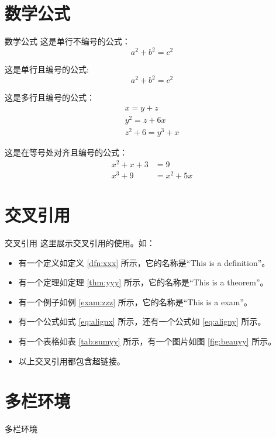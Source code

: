 \documentclass[compress,10pt,dvipsnames,notheorems]{beamer} %
\begin{document}
\section{数学公式}%
\begin{frame}{数学公式}
	这是单行不编号的公式：
	\[ a^2 + b^2 = c^2 \]
	
	这是单行且编号的公式:
	\begin{equation}
		a^2 + b^2 = c^2
	\end{equation}

	这是多行且编号的公式：
	\begin{gather}
		x = y + z \\
		y^2 = z + 6x \\
		z^2 + 6 = y^3 + x
	\end{gather}
	
	这是在等号处对齐且编号的公式：
	\begin{align}
		x^2 + x + 3 &= 9 \label{eq:alignx} \\
		x^3 + 9 &= x^2 + 5x \label{eq:aligny}
	\end{align}	
\end{frame}

\section{交叉引用}

\begin{frame}{交叉引用}
	这里展示交叉引用的使用。如：
	\begin{itemize}
		\item 有一个定义如定义 \ref{dfn:xxx} 所示，它的名称是“This is a definition”。
		\item 有一个定理如定理 \ref{thm:yyy} 所示，它的名称是“This is a theorem”。
		\item 有一个例子如例 \ref{exam:zzz} 所示，它的名称是“This is a exam”。
		\item 有一个公式如式 \eqref{eq:alignx} 所示，还有一个公式如 \eqref{eq:aligny} 所示。
		\item 有一个表格如表 \ref{tab:sumyy} 所示，有一个图片如图 \ref{fig:beauyy} 所示。
		\item 以上交叉引用都包含超链接。
	\end{itemize}
\end{frame}

\section{多栏环境}%

\begin{frame}{多栏环境}
	\begin{columns}
		\lipsum[1][1-8]
		
		\lipsum[3][1-3]
	\end{columns}
\end{frame}


\begin{frame}
\vspace{0.12\textheight}\centering\Huge{}\hspace{0em}
\end{frame}
\end{document}
